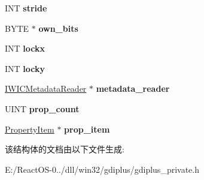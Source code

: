 \begin{DoxyCompactItemize}
I\+NT {\bfseries stride}
\item 
\mbox{\label{struct_gp_bitmap_a13e2d74c3f185b2269943024db95948d}} 
B\+Y\+TE $\ast$ {\bfseries own\+\_\+bits}
\item 
\mbox{\label{struct_gp_bitmap_a69f03f440affe72821109f560cfb8af1}} 
I\+NT {\bfseries lockx}
\item 
\mbox{\label{struct_gp_bitmap_ad285fb2d296b961ce80101c3e6fc45a2}} 
I\+NT {\bfseries locky}
\item 
\mbox{\label{struct_gp_bitmap_a53c2a38fbf8b855e9d9a927a8c1b2d0f}} 
\hyperlink{interface_i_w_i_c_metadata_reader}{I\+W\+I\+C\+Metadata\+Reader} $\ast$ {\bfseries metadata\+\_\+reader}
\item 
\mbox{\label{struct_gp_bitmap_a79825b759ed25a624c8182f4659b8fae}} 
U\+I\+NT {\bfseries prop\+\_\+count}
\item 
\mbox{\label{struct_gp_bitmap_a819a4377f24d9554648cdc846a79890c}} 
\hyperlink{struct_property_item}{Property\+Item} $\ast$ {\bfseries prop\+\_\+item}
\end{DoxyCompactItemize}


该结构体的文档由以下文件生成\+:\begin{DoxyCompactItemize}
\item 
E\+:/\+React\+O\+S-\/0../dll/win32/gdiplus/gdiplus\+\_\+private.\+h\end{DoxyCompactItemize}
